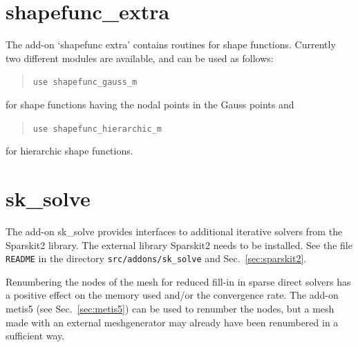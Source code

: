\section{shapefunc\_extra}
\label{sec:shapefunc_extra}

The add-on `shapefunc extra' contains routines for shape functions.
Currently two different modules are available, and
can be used as follows:
\begin{quote}
   \texttt{use shapefunc\_gauss\_m}
\end{quote}
for shape functions having the nodal points in the Gauss points and
\begin{quote}
   \texttt{use shapefunc\_hierarchic\_m}
\end{quote}
for hierarchic shape functions.

\section{sk\_solve}
\label{sec:sksolve}

The add-on sk\_solve provides interfaces to additional iterative solvers
from the Sparskit2 library. The external library Sparskit2 needs to be installed.
See the file \texttt{README} in the directory
\texttt{src/addons/sk\_solve} and Sec.~\ref{sec:sparskit2}.

Renumbering the nodes of the mesh for reduced fill-in
in sparse direct solvers has a positive effect on the memory used and/or the
convergence rate.
The add-on metis5 (see Sec.~\ref{sec:metis5}) can be used to renumber
the nodes, but a mesh made with an external meshgenerator may already have
been renumbered in a sufficient way.

